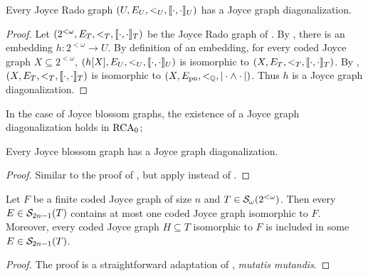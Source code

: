 \begin{corollary}[$\ACA_0$]\label{cor:joyce-diagonalization-exists-Rado}
  Every Joyce Rado graph $(U, E_U, <_U, \llbracket \cdot , \cdot \rrbracket_U)$ has a Joyce graph diagonalization.
\end{corollary}
\begin{proof}
Let $(2^{<\omega}, E_T, <_T, \llbracket \cdot , \cdot \rrbracket_T)$ be the Joyce Rado graph of . By , there is an embedding $h: 2^{<\omega} \to U$. By definition of an embedding, for every coded Joyce graph $X \subseteq 2^{<\omega}$, $(h[X], E_U, <_U, \llbracket \cdot , \cdot \rrbracket_U)$ is isomorphic to $(X, E_T, <_T, \llbracket \cdot , \cdot \rrbracket_T)$. By , $(X, E_T, <_T, \llbracket \cdot , \cdot \rrbracket_T)$ is isomorphic to $(X, E_{\mathrm{pn}}, <_{\mathbb{Q}}, |\cdot \wedge \cdot|)$. Thus $h$ is a Joyce graph diagonalization.
\end{proof}

In the case of Joyce blossom graphs, the existence of a Joyce graph diagonalization holds in $\RCA_0$;

\begin{corollary}[$\RCA_0$]\label{cor:joyce-diagonalization-exists-blossom}
  Every Joyce blossom graph has a Joyce graph diagonalization.
\end{corollary}
\begin{proof}
Similar to the proof of ,
but apply  instead of .
\end{proof}

\begin{lemma}\label{lem:coded-joyce-order-to-strong-subtree-Rado}
Let $F$ be a finite coded Joyce graph of size $n$ and $T \in \mathcal{S}_{\omega}({2^{<\omega}})$.
Then every $E \in \mathcal{S}_{2n-1}({T})$ contains at most one coded Joyce graph isomorphic to $F$. Moreover, every coded Joyce graph $H \subseteq T$ isomorphic to $F$
	is included in some $E \in \mathcal{S}_{2n-1}({T})$.
\end{lemma}
\begin{proof}
The proof is a straightforward adaptation of , \emph{mutatis mutandis}.
\end{proof}

